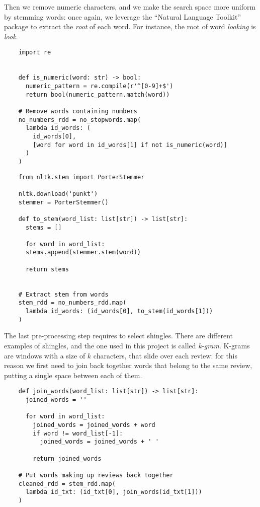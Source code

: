 \documentclass{article}
\begin{document}
  Then we remove numeric characters, and we make the search space more uniform
  by stemming words: once again, we leverage the “Natural Language Toolkit”
  package to extract the \textit{root} of each word. For instance, the root of
  word \textit{looking} is \textit{look}. \\
  \begin{verbatim}
    import re


    def is_numeric(word: str) -> bool:
      numeric_pattern = re.compile(r'^[0-9]+$')
      return bool(numeric_pattern.match(word))

    # Remove words containing numbers
    no_numbers_rdd = no_stopwords.map(
      lambda id_words: (
        id_words[0],
        [word for word in id_words[1] if not is_numeric(word)]
      )
    )
  \end{verbatim}
  \begin{verbatim}
    from nltk.stem import PorterStemmer

    nltk.download('punkt')
    stemmer = PorterStemmer()

    def to_stem(word_list: list[str]) -> list[str]:
      stems = []

      for word in word_list:
      stems.append(stemmer.stem(word))

      return stems


    # Extract stem from words
    stem_rdd = no_numbers_rdd.map(
      lambda id_words: (id_words[0], to_stem(id_words[1]))
    )
  \end{verbatim}
  The last pre-processing step requires to select shingles. There are different
  examples of shingles, and the one used in this project is called
  \textit{k-gram}. K-grams are windows with a size of \( k \) characters, that
  slide over each review: for this reason we first need to join back together
  words that belong to the same review, putting a single space between each of
  them. \\
  \begin{verbatim}
    def join_words(word_list: list[str]) -> list[str]:
      joined_words = ''

      for word in word_list:
        joined_words = joined_words + word
        if word != word_list[-1]:
          joined_words = joined_words + ' '

        return joined_words

    # Put words making up reviews back together
    cleaned_rdd = stem_rdd.map(
      lambda id_txt: (id_txt[0], join_words(id_txt[1]))
    )
  \end{verbatim}
\end{document}
